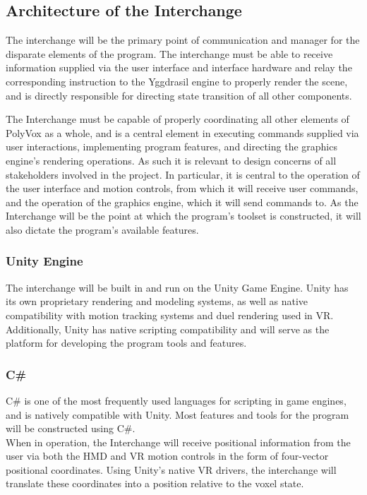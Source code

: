 \documentclass[onecolumn, draftclsnofoot,10pt, compsoc]{IEEEtran}
\begin{document}
\subsection{Architecture of the Interchange}
The interchange will be the primary point of communication and manager for the disparate elements of the program. The interchange must be able to receive information supplied via the user interface and interface hardware and relay the corresponding instruction to the Yggdrasil engine to properly render the scene, and is directly responsible for directing state transition of all other components.

The Interchange must be capable of properly coordinating all other elements of PolyVox as a whole, and is a central element  in executing commands supplied via user interactions, implementing program features, and directing the graphics engine’s rendering operations. As such it is relevant to design concerns of all stakeholders involved in the project. In particular, it is central to the operation of the user interface and motion controls, from which it will receive user commands, and the operation of the graphics engine, which it will send commands to. As the Interchange will be the point at which the program’s toolset is constructed, it will also dictate the program’s available features.\\

\subsubsection{Unity Engine}
The interchange will be built in and run on the Unity Game Engine. Unity has its own proprietary rendering and modeling systems, as well as native compatibility with motion tracking systems and duel rendering used in VR. Additionally, Unity has native scripting compatibility and will serve as the platform for developing the program tools and features.\cite{unity}
\subsubsection{C\#}
C\# is one of the most frequently used languages for scripting in game engines, and is natively compatible with Unity. Most features and tools for the program will be constructed using C\#. \\
When in operation, the Interchange will receive positional information from the user via both the HMD and VR motion controls in the form of four-vector positional coordinates. Using Unity’s native VR drivers, the interchange will translate these coordinates into a position relative to the voxel state. \\
\end{document}
